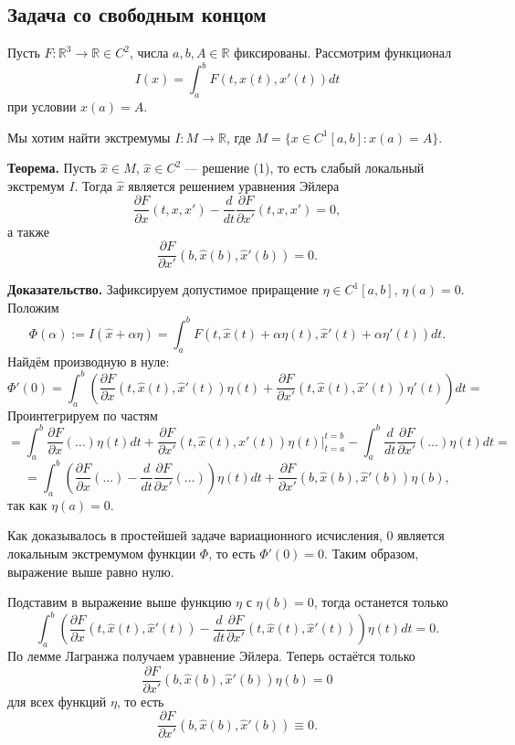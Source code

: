 \setcounter{equation}{0}
\subsection{Задача со свободным концом}
Пусть $F: \mathbb R^3 \to \mathbb R \in C^2$, числа $a, b, A \in \mathbb R$ фиксированы.
Рассмотрим функционал
\begin{equation}
    I(x) = \int_a^b F(t, x(t), x'(t)) dt
\end{equation}
при условии $x(a) = A$.

Мы хотим найти экстремумы $I: M \to \mathbb R$, где $M = \{x \in C^1[a, b]: x(a) = A\}$.

\textbf{Теорема.} Пусть $\widehat x \in M$, $\widehat x \in C^2$ --- решение (1), то есть слабый локальный экстремум $I$.
Тогда $\widehat x$ является решением уравнения Эйлера
\[
    \frac{\partial F}{\partial x}(t, x, x') - \frac{d}{dt} \frac{\partial F}{\partial x'}(t, x, x') = 0,
\]
а также
\begin{equation}
    \frac{\partial F}{\partial x'}(b, \widehat x(b), \widehat x'(b)) = 0.
\end{equation}

\textbf{Доказательство.} Зафиксируем допустимое приращение $\eta \in C^1[a, b]$, $\eta(a) = 0$.
Положим
\[
    \Phi(\alpha) := I(\widehat x + \alpha \eta) = \int_a^b F(t, \widehat x(t) + \alpha \eta(t), \widehat x'(t) + \alpha \eta'(t)) dt.
\]
Найдём производную в нуле:
\[
    \Phi'(0) = \int_a^b \left( \frac{\partial F}{\partial x}(t, \widehat x(t), \widehat x'(t)) \eta(t) + \frac{\partial F}{\partial x'} (t, \widehat x(t), \widehat x'(t)) \eta'(t) \right) dt =
\]
Проинтегрируем по частям
\[
    = \int_a^b \frac{\partial F}{\partial x}(\dots)\eta(t) dt + \frac{\partial F}{\partial x'} (t, \widehat x(t), \widehat x'(t)) \eta(t) \bigg|_{t=a}^{t=b} - \int_a^b \frac{d}{dt} \frac{\partial F}{\partial x'}(\dots) \eta(t) dt =
\]
\[
    = \int_a^b \left( \frac{\partial F}{\partial x}(\dots) - \frac{d}{dt} \frac{\partial F}{\partial x'}(\dots) \right) \eta(t) dt + \frac{\partial F}{\partial x'}(b, \widehat x(b), \widehat x'(b)) \eta(b),
\]
так как $\eta(a) = 0$.

Как доказывалось в простейшей задаче вариационного исчисления, $0$ является локальным экстремумом функции $\Phi$, то есть $\Phi'(0) = 0$.
Таким образом, выражение выше равно нулю.

Подставим в выражение выше функцию $\eta$ с $\eta(b) = 0$, тогда останется только
\[
    \int_a^b \left( \frac{\partial F}{\partial x}(t, \widehat x(t), \widehat x'(t)) - \frac{d}{dt} \frac{\partial F}{\partial x'}(t, \widehat x(t), \widehat x'(t)) \right) \eta(t) dt = 0.
\]
По лемме Лагранжа получаем уравнение Эйлера.
Теперь остаётся только 
\[
    \frac{\partial F}{\partial x'} (b, \widehat x(b), \widehat x'(b)) \eta(b) = 0
\]
для всех функций $\eta$, то есть
\[
    \frac{\partial F}{\partial x'} (b, \widehat x(b), \widehat x'(b))  \equiv 0.
\]

